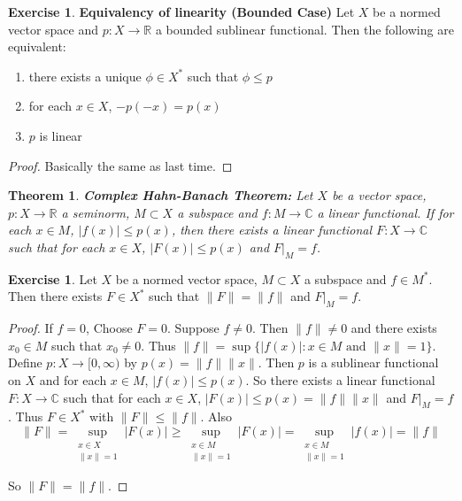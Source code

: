 \documentclass[12pt]{amsart}
\newtheorem{thm}{Theorem}[subsection]
\theoremstyle{definition}
\theoremstyle{remark}
\theoremstyle{definition}
\newtheorem{ex}[definition]{Exercise}
\newcommand{\C}{\mathbb{C}}
\newcommand{\R}{\mathbb{R}}
\newcommand{\Rg}{[0,\infty)}
\begin{document}
	\begin{ex}\textbf{Equivalency of linearity (Bounded Case)}
	Let $X$ be a normed vector space and $p:X \rightarrow \R$ a bounded sublinear functional. Then the following are equivalent:
	\begin{enumerate}
	\item there exists a unique $\phi \in X^*$ such that $\phi \leq p$
	\item for each $x \in X$, $-p(-x) = p(x)$
	\item $p$ is linear
\end{enumerate}	
	\end{ex}
	
	\begin{proof}
	Basically the same as last time.
	\end{proof}
	
	\begin{thm}\textbf{Complex Hahn-Banach Theorem:}
		Let $X$ be a vector space, $p:X \rightarrow \R$ a seminorm, $M \subset X$ a subspace and $f:M \rightarrow \C$ a linear functional. If for each $x \in M$, $\vert f(x) \vert \leq p(x)$, then there exists a linear functional $F:X \rightarrow \C$ such that for each $x \in X$, $\vert F(x) \vert \leq p(x)$ and $F|_{M}=f$.
	\end{thm}	
	
	\begin{ex}
		Let $X$ be a normed vector space, $M \subset X$ a subspace and $f \in M^*$. Then there exists $F \in X^*$ such that $\|F \|= \|f \|$ and $F|_M = f$.  
	\end{ex}
	
	\begin{proof}
		If $f =0$, Choose $F=0$. Suppose $f \neq 0$. Then $\|f \|\neq 0$ and there exists $x_0 \in M$ such that $x_0  \neq 0$. Thus $\|f \|= \sup \{ \vert f(x) \vert: x \in M \text{ and } \|x \|= 1\}$. Define $p:X \rightarrow \Rg$ by $ p(x) = \|f \|\|x \|$. Then $p$ is a sublinear functional on $X$ and for each $x \in M$, $\vert f(x) \vert \leq p(x)$. So there exists a linear functional $F:X \rightarrow \C$ such that for each $x \in X$, $\vert F(x) \vert \leq p(x) = \|f \|\|x \|$ and $F|_M = f$. Thus $F \in X^*$ with $\|F \|\leq \|f \|$. Also $$\|F \|= \sup_{\substack{ x \in X \\ \|x \|= 1}} \vert F(x) \vert \geq  \sup_{\substack{ x \in M \\ \|x \|= 1}} \vert F(x) \vert = \sup_{\substack{ x \in M \\ \|x \|= 1}} \vert f(x) \vert = \|f \|$$
		
		So $\|F \|= \|f \|$.
	\end{proof}
	
\end{document}
